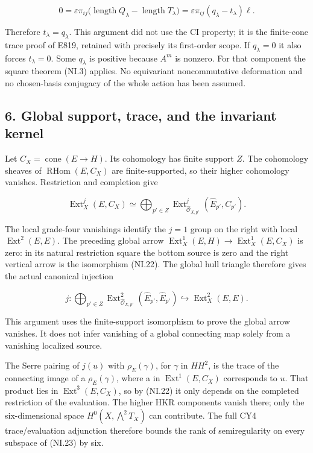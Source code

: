 \[
 0=\varepsilon\pi_{ij}
       \bigl(\operatorname{length}Q_\lambda
                  -\operatorname{length}T_\lambda\bigr)
   =\varepsilon\pi_{ij}(q_\lambda-t_\lambda)\ell.
 \tag{NI.21}
\]

Therefore \(t_{\lambda}=q_{\lambda}\). This argument did not use the CI
property; it is the finite-cone trace proof of E819, retained
with precisely its first-order scope. If \(q_{\lambda}=0\) it also
forces \(t_{\lambda}=0\). Some \(q_{\lambda}\) is positive because \(A^m\) is
nonzero. For that component the square theorem (NI.3) applies.
No equivariant noncommutative deformation and no chosen-basis
conjugacy of the whole action has been assumed.

\subsection{6. Global support, trace, and the invariant kernel}\label{SF-E849:s6}

Let \(C_X=\operatorname{cone}(E\to H)\). Its cohomology has finite support \(Z\). The
cohomology sheaves of \(\operatorname{RHom}(E,C_X)\) are finite-supported, so their
higher cohomology vanishes. Restriction and completion give

\[
 \operatorname{Ext}^j_X(E,C_X)
       \simeq\bigoplus_{p'\in Z}
          \operatorname{Ext}^j_{\widehat{\mathcal O}_{X,p'}}
                             (\widehat E_{p'},C_{p'}).
 \tag{NI.22}
\]

The local grade-four vanishings identify the \(j=1\) group on the
right with local \(\operatorname{Ext}^2(E,E)\). The preceding global arrow
\(\operatorname{Ext}^1_X(E,H)\to \operatorname{Ext}^1_X(E,C_X)\) is zero: in its natural restriction
square the bottom source is zero and the right vertical arrow
is the isomorphism (NI.22). The global hull triangle therefore
gives the actual canonical injection

\[
 j:\bigoplus_{p'\in Z}
        \operatorname{Ext}^2_{\widehat{\mathcal O}_{X,p'}}
                        (\widehat E_{p'},\widehat E_{p'})
                 \hookrightarrow\operatorname{Ext}^2_X(E,E).
 \tag{NI.23}
\]

This argument uses the finite-support isomorphism to prove the
global arrow vanishes. It does not infer vanishing of a global
connecting map solely from a vanishing localized source.

The Serre pairing of \(j(u)\) with \(\rho_E(\gamma)\), for \(\gamma\) in \(HH^2\),
is the trace of the connecting image of a \(\rho_E(\gamma)\), where
a in \(\operatorname{Ext}^1(E,C_X)\) corresponds to \(u\). That product lies in
\(\operatorname{Ext}^3(E,C_X)\), so by (NI.22) it only depends on the completed
restriction of the evaluation. The higher HKR components
vanish there; only the six-dimensional space
\(H^0(X,\bigwedge^2T_X)\) can contribute. The full CY4 trace/evaluation
adjunction therefore bounds the rank of semiregularity on
every subspace of (NI.23) by six.

